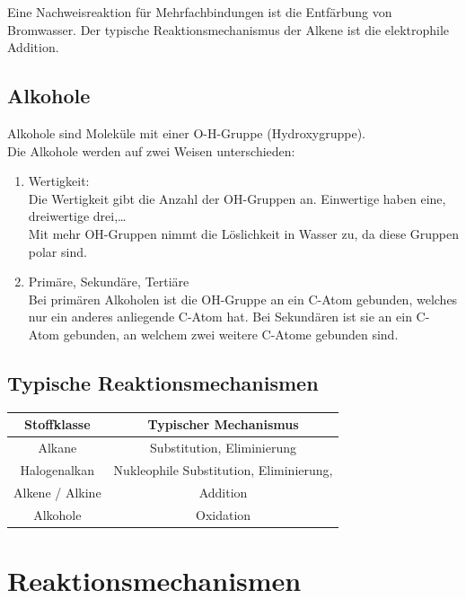 \documentclass[a4paper]{report}
\begin{document}
Eine Nachweisreaktion für Mehrfachbindungen ist die Entfärbung von Bromwasser. Der typische Reaktionsmechanismus der Alkene ist die elektrophile Addition.


\subsection{Alkohole}

Alkohole sind Moleküle mit einer O-H-Gruppe (Hydroxygruppe).\\
Die Alkohole werden auf zwei Weisen unterschieden:
\begin{enumerate}
    \item Wertigkeit:\\
            Die Wertigkeit gibt die Anzahl der OH-Gruppen an. Einwertige haben eine, dreiwertige drei,\dots\\
            Mit mehr OH-Gruppen nimmt die Löslichkeit in Wasser zu, da diese Gruppen polar sind.
    \item Primäre, Sekundäre, Tertiäre\\
            Bei primären Alkoholen ist die OH-Gruppe an ein C-Atom gebunden, welches nur ein anderes anliegende C-Atom hat.
            Bei Sekundären ist sie an ein C-Atom gebunden, an welchem zwei weitere C-Atome gebunden sind.\\
\end{enumerate}


\subsection{Typische Reaktionsmechanismen}
\begin{tabular}{|c|c|} \hline
    Stoffklasse &Typischer Mechanismus \\\hline
    Alkane &Substitution, Eliminierung\\
    Halogenalkan &Nukleophile Substitution, Eliminierung,\\
    Alkene / Alkine &Addition\\
    Alkohole &Oxidation \\ \hline
\end{tabular}





\section{Reaktionsmechanismen}
\end{document}

